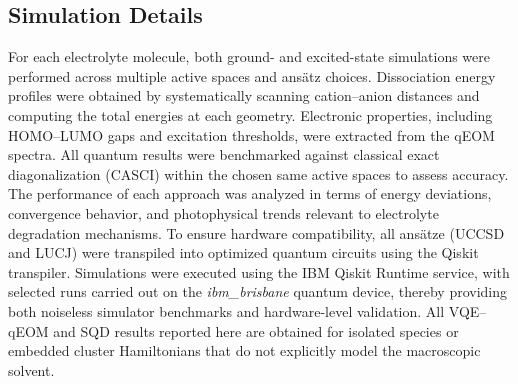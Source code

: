 \documentclass[num-refs]{wiley-article}
\begin{document}


\subsection{Simulation Details}

For each electrolyte molecule, both ground- and excited-state simulations were performed across multiple active spaces and ans\"atz choices. Dissociation energy profiles were obtained by systematically scanning cation–anion distances and computing the total energies at each geometry. Electronic properties, including HOMO–LUMO gaps and excitation thresholds, were extracted from the qEOM spectra. All quantum results were benchmarked against classical exact diagonalization (CASCI) within the chosen same active spaces to assess accuracy. The performance of each approach was analyzed in terms of energy deviations, convergence behavior, and photophysical trends relevant to electrolyte degradation mechanisms. To ensure hardware compatibility, all ans\"atze (UCCSD and LUCJ) were transpiled into optimized quantum circuits using the Qiskit transpiler. Simulations were executed using the IBM Qiskit Runtime service\cite{matthew_treinish_2023_8190968,nation2023suppressing}, with selected runs carried out on the \textit{ibm\_brisbane} quantum device, thereby providing both noiseless simulator benchmarks and hardware-level validation. All VQE–qEOM and SQD results reported here are obtained for isolated species or embedded cluster Hamiltonians that do not explicitly model the macroscopic solvent.
\end{document}
